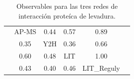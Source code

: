 \begin{table}[!ht]
    \centering
    \caption{\label{tab:overlap}Observables para las tres redes de interacci\'on prote\'ica de levadura.}
    {\scriptsize
    \begin{tabularx}{.6\columnwidth}{XccccX}
        \hline\hline
        &AP-MS & 0.44 & 0.57 & 0.89 &\\
        &0.35& Y2H &0.36 & 0.66 &\\
        &0.60&0.48& LIT & 1.00 &\\
        &0.43&0.40& 0.46& LIT\_Reguly&\\
        \hline\hline
    \end{tabularx}
    }
\end{table}

%
%
%
%
